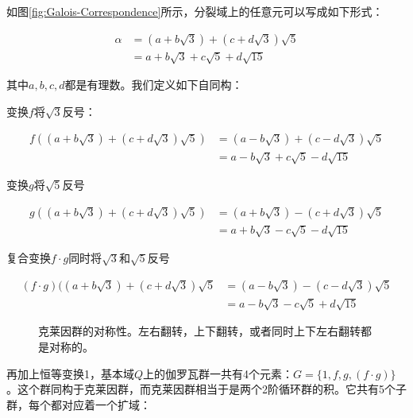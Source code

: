 \documentclass[b5paper]{ctexart}
\begin{document}
如图\ref{fig:Galois-Correspondence}所示，分裂域上的任意元可以写成如下形式：

\[
\begin{array}{rl}
\alpha &= (a + b\sqrt{3}) + (c + d\sqrt{3}) \sqrt {5} \\
       &= a + b\sqrt{3} + c\sqrt{5} + d\sqrt{15}
\end{array}
\]

其中$a, b, c, d$都是有理数。我们定义如下自同构：

变换$f$将$\sqrt{3}$反号：

\[
\begin{array}{rl}
f((a + b\sqrt{3}) + (c + d\sqrt{3}) \sqrt {5}) & = (a - b\sqrt{3}) + (c - d\sqrt{3})\sqrt{5} \\
 & = a - b\sqrt{3} + c\sqrt{5} - d\sqrt{15}
\end{array}
\]

变换$g$将$\sqrt{5}$反号

\[
\begin{array}{rl}
g((a + b\sqrt{3}) + (c + d\sqrt{3}) \sqrt {5}) & = (a + b\sqrt{3}) - (c + d\sqrt{3})\sqrt{5} \\
 & = a + b\sqrt{3} - c\sqrt{5} - d\sqrt{15}
\end{array}
\]

复合变换$f \cdot g$同时将$\sqrt{3}$和$\sqrt{5}$反号

\[
\begin{array}{rl}
(f \cdot g)((a + b\sqrt{3}) + (c + d\sqrt{3}) \sqrt {5} & = (a - b\sqrt{3}) - (c - d\sqrt{3})\sqrt{5} \\
 & = a - b\sqrt{3} - c\sqrt{5} + d\sqrt{15}
\end{array}
\]

\begin{figure}
\centering
{}
\captionsetup{labelformat=empty}
\caption{克莱因群的对称性。左右翻转，上下翻转，或者同时上下左右翻转都是对称的。}
\label{fig:Klein-four-group}
\end{figure}

再加上恒等变换1，基本域$Q$上的伽罗瓦群一共有4个元素：$G = \{1, f, g, (f \cdot g)\}$。这个群同构于克莱因群，而克莱因群相当于是两个2阶循环群的积。它共有5个子群，每个都对应着一个扩域：
\end{document}
